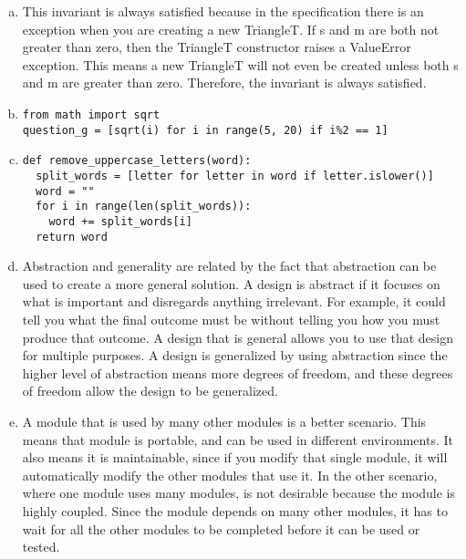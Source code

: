 \documentclass[12pt]{article}
\begin{document}
\begin{enumerate}[a)]
\item This invariant is always satisfied because in the specification there is an exception when you are creating a new TriangleT. If s and m are both not greater than zero, then the TriangleT constructor raises a ValueError exception. This means a new TriangleT will not even be created unless both s and m are greater than zero. Therefore, the invariant is always satisfied.

\item \begin{lstlisting}
from math import sqrt
question_g = [sqrt(i) for i in range(5, 20) if i%2 == 1]
\end{lstlisting}

\item \begin{lstlisting}
def remove_uppercase_letters(word):
  split_words = [letter for letter in word if letter.islower()]
  word = ""
  for i in range(len(split_words)):
    word += split_words[i]
  return word
\end{lstlisting}

\item Abstraction and generality are related by the fact that abstraction can be used to create a more general solution. A design is abstract if it focuses on what is important and disregards anything irrelevant. For example, it could tell you what the final outcome must be without telling you how you must produce that outcome. A design that is general allows you to use that design for multiple purposes. A design is generalized by using abstraction since the higher level of abstraction means more degrees of freedom, and these degrees of freedom allow the design to be generalized.

\item A module that is used by many other modules is a better scenario. This means that module is portable, and can be used in different environments. It also means it is maintainable, since if you modify that single module, it will automatically modify the other modules that use it. In the other scenario, where one module uses many modules, is not desirable because the module is highly coupled. Since the module depends on many other modules, it has to wait for all the other modules to be completed before it can be used or tested.

\end{enumerate}

\newpage

\lstset{language=Python, basicstyle=\tiny, breaklines=true, showspaces=false,
  showstringspaces=false, breakatwhitespace=true}
\end{document}
